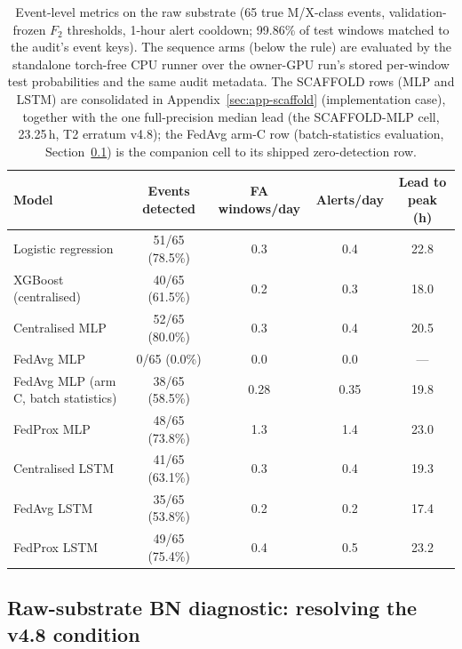 \begin{table}[t]
\centering
\caption{Event-level metrics on the raw substrate (65 true M/X-class
events, validation-frozen $F_2$ thresholds, 1-hour alert cooldown;
99.86\% of test windows matched to the audit's event keys). The
sequence arms (below the rule) are evaluated by the standalone
torch-free CPU runner over the owner-GPU run's stored per-window
test probabilities and the same audit metadata. The SCAFFOLD rows
(MLP and LSTM) are consolidated in Appendix~\ref{sec:app-scaffold}
(implementation case), together with the one full-precision median
lead (the SCAFFOLD-MLP cell, 23.25\,h, T2 erratum v4.8); the
FedAvg arm-C row (batch-statistics evaluation,
Section~\ref{sec:res-rawbn}) is the companion cell to its shipped
zero-detection row.}
\label{tab:eventlevel-raw}
\small
\begin{tabular}{@{}l c c c c@{}}
\toprule
\textbf{Model} & \textbf{Events detected} & \textbf{FA windows/day} &
\textbf{Alerts/day} & \textbf{Lead to peak (h)} \\
\midrule
Logistic regression & 51/65 (78.5\%) & 0.3 & 0.4 & 22.8 \\
XGBoost (centralised) & 40/65 (61.5\%) & 0.2 & 0.3 & 18.0 \\
Centralised MLP & 52/65 (80.0\%) & 0.3 & 0.4 & 20.5 \\
FedAvg MLP & 0/65 (0.0\%) & 0.0 & 0.0 & --- \\
FedAvg MLP (arm C, batch statistics) & 38/65 (58.5\%) & 0.28 & 0.35 & 19.8 \\
FedProx MLP & 48/65 (73.8\%) & 1.3 & 1.4 & 23.0 \\
\midrule
Centralised LSTM & 41/65 (63.1\%) & 0.3 & 0.4 & 19.3 \\
FedAvg LSTM & 35/65 (53.8\%) & 0.2 & 0.2 & 17.4 \\
FedProx LSTM & 49/65 (75.4\%) & 0.4 & 0.5 & 23.2 \\
\bottomrule
\end{tabular}
\end{table}

\subsection{Raw-substrate BN diagnostic: resolving the v4.8 condition}
\label{sec:res-rawbn}

